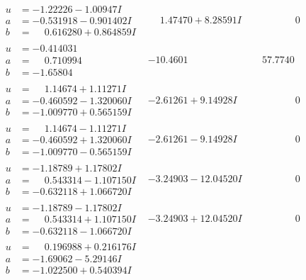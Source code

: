\documentclass[1p]{elsarticle_modified}
\theoremstyle{definition}
\begin{document}
$$\begin{array}{c|c|c}
\begin{aligned}
u &= -1.22226 - 1.00947 I \\
a &= -0.531918 - 0.901402 I \\
b &= \phantom{-}0.616280 + 0.864859 I\end{aligned}
 & \phantom{-}1.47470 + 8.28591 I & \phantom{-0.000000 } 0 \\ \hline\begin{aligned}
u &= -0.414031\phantom{ +0.000000I} \\
a &= \phantom{-}0.710994\phantom{ +0.000000I} \\
b &= -1.65804\phantom{ +0.000000I}\end{aligned}
 & -10.4601\phantom{ +0.000000I} & \phantom{-}57.7740\phantom{ +0.000000I} \\ \hline\begin{aligned}
u &= \phantom{-}1.14674 + 1.11271 I \\
a &= -0.460592 - 1.320060 I \\
b &= -1.009770 + 0.565159 I\end{aligned}
 & -2.61261 + 9.14928 I & \phantom{-0.000000 } 0 \\ \hline\begin{aligned}
u &= \phantom{-}1.14674 - 1.11271 I \\
a &= -0.460592 + 1.320060 I \\
b &= -1.009770 - 0.565159 I\end{aligned}
 & -2.61261 - 9.14928 I & \phantom{-0.000000 } 0 \\ \hline\begin{aligned}
u &= -1.18789 + 1.17802 I \\
a &= \phantom{-}0.543314 - 1.107150 I \\
b &= -0.632118 + 1.066720 I\end{aligned}
 & -3.24903 - 12.04520 I & \phantom{-0.000000 } 0 \\ \hline\begin{aligned}
u &= -1.18789 - 1.17802 I \\
a &= \phantom{-}0.543314 + 1.107150 I \\
b &= -0.632118 - 1.066720 I\end{aligned}
 & -3.24903 + 12.04520 I & \phantom{-0.000000 } 0 \\ \hline\begin{aligned}
u &= \phantom{-}0.196988 + 0.216176 I \\
a &= -1.69062 - 5.29146 I \\
b &= -1.022500 + 0.540394 I\end{aligned}

\end{array}$$
\end{document}
